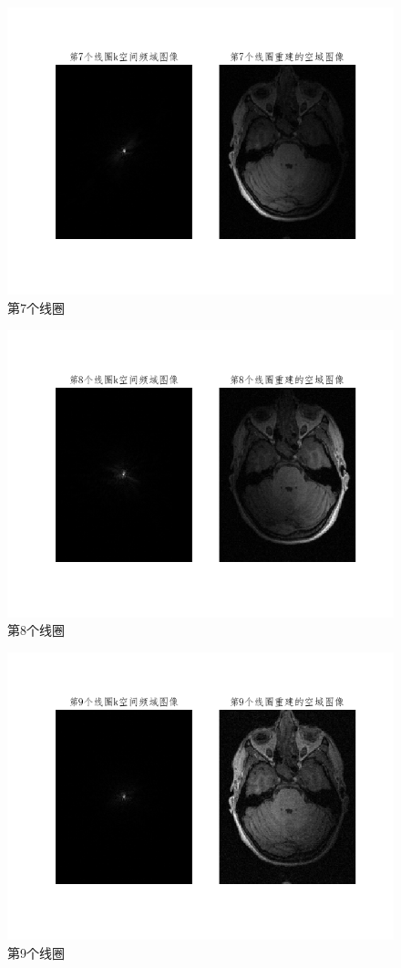 \begin{figure}[H]
    \centering
    \includegraphics[width=0.6\linewidth]{fig/coil7.png}
    \caption{第7个线圈}
    \label{fig:coil7}
\end{figure}


\begin{figure}[H]
    \centering
    \includegraphics[width=0.6\linewidth]{fig/coil8.png}
    \caption{第8个线圈}
    \label{fig:coil8}
\end{figure}


\begin{figure}[H]
    \centering
    \includegraphics[width=0.6\linewidth]{fig/coil9.png}
    \caption{第9个线圈}
    \label{fig:coil9}
\end{figure}


